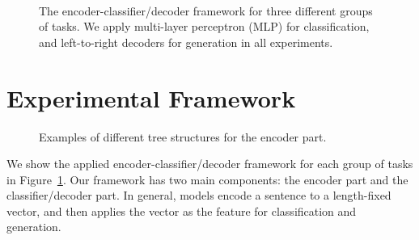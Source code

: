 \documentclass[11pt,a4paper]{article}
\begin{document}
\begin{figure}[t!]
\centering
{}
~~~~~
\\
\caption{\label{fig:model-structures} The encoder-classifier/decoder framework for three different groups of tasks. We apply multi-layer perceptron (MLP) for classification, and left-to-right decoders for generation in all experiments. \\[-0.8cm] }
\end{figure}


\section{Experimental Framework}
\label{sec:structures}

\begin{figure*}[t]
    \centering
    \caption{\label{fig:tree-examples} Examples of different tree structures for the encoder part. }
\end{figure*}

We show the applied encoder-classifier/decoder framework for each group of tasks in Figure~\ref{fig:model-structures}.
Our framework has two main components: the encoder part and the classifier/decoder part. 
In general, models encode a sentence to a length-fixed vector, and then applies the vector as the feature for classification and generation. 
\end{document}
